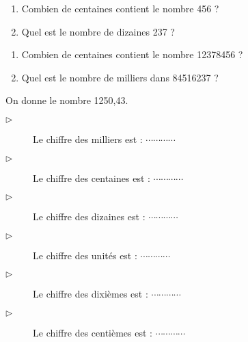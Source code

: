 
\begin{enumerate}
\item Combien de centaines contient le nombre 456 ?
\item Quel est le nombre de dizaines 237 ?
\end{enumerate}


\begin{enumerate}
\item Combien de centaines contient le nombre 12378456 ?
\item Quel est le nombre de milliers dans 84516237 ?
\end{enumerate}



On donne le  nombre 1250,43. 
\begin{description}
\item[$\triangleright$] Le chiffre des milliers est : $ \cdots\cdots\cdots\cdots $
\item[$\triangleright$] Le chiffre des centaines est : $ \cdots\cdots\cdots\cdots $
\item[$\triangleright$] Le chiffre des dizaines est : $ \cdots\cdots\cdots\cdots $
\item[$\triangleright$] Le chiffre des unités est : $ \cdots\cdots\cdots\cdots $
\item[$\triangleright$] Le chiffre des dixièmes est : $ \cdots\cdots\cdots\cdots $
\item[$\triangleright$] Le chiffre des centièmes est : $ \cdots\cdots\cdots\cdots $
\end{description}



